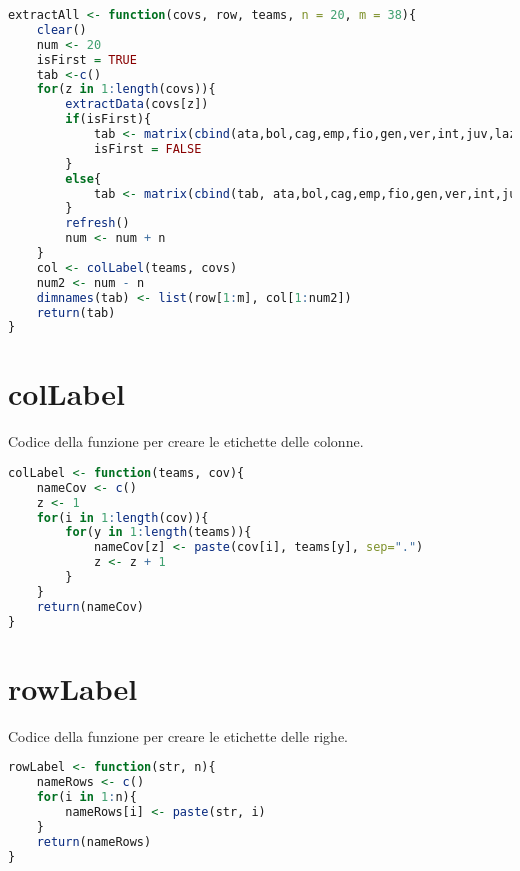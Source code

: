 \begin{lstlisting}[language=R, caption={Codice per estrarre le informazioni di tutte le variabili.}, captionpos=b, label=code:a6]
extractAll <- function(covs, row, teams, n = 20, m = 38){
	clear()
	num <- 20
	isFirst = TRUE
	tab <-c()
	for(z in 1:length(covs)){
		extractData(covs[z])
		if(isFirst){
			tab <- matrix(cbind(ata,bol,cag,emp,fio,gen,ver,int,juv,laz,mil,nap,rom,sal,sam,sas,spe,tor,udi,ven), nrow = m, ncol = num)
			isFirst = FALSE
		}
		else{
			tab <- matrix(cbind(tab, ata,bol,cag,emp,fio,gen,ver,int,juv,laz,mil,nap,rom,sal,sam,sas,spe,tor,udi,ven), nrow = m, ncol = num)
		}
		refresh()
		num <- num + n 		
	}
	col <- colLabel(teams, covs)  
	num2 <- num - n
	dimnames(tab) <- list(row[1:m], col[1:num2])
	return(tab)
}
\end{lstlisting}

\section{colLabel}
\label{sez:Z1.3}
Codice della funzione per creare le etichette delle colonne.

\begin{lstlisting}[language=R, caption={Codice  per creare le etichette delle colonne.}, captionpos=b, label=code:a7]
colLabel <- function(teams, cov){
	nameCov <- c()
	z <- 1
	for(i in 1:length(cov)){
		for(y in 1:length(teams)){
			nameCov[z] <- paste(cov[i], teams[y], sep=".")
			z <- z + 1
		}
	}
	return(nameCov)
}

\end{lstlisting}

\section{rowLabel}
\label{sez:Z1.4}
Codice della funzione  per creare le etichette delle righe.

\begin{lstlisting}[language=R, caption={Codice per creare le etichette delle righe.}, captionpos=b, label=code:a8]
rowLabel <- function(str, n){
	nameRows <- c()
	for(i in 1:n){
		nameRows[i] <- paste(str, i)
	}
	return(nameRows)
}

\end{lstlisting}